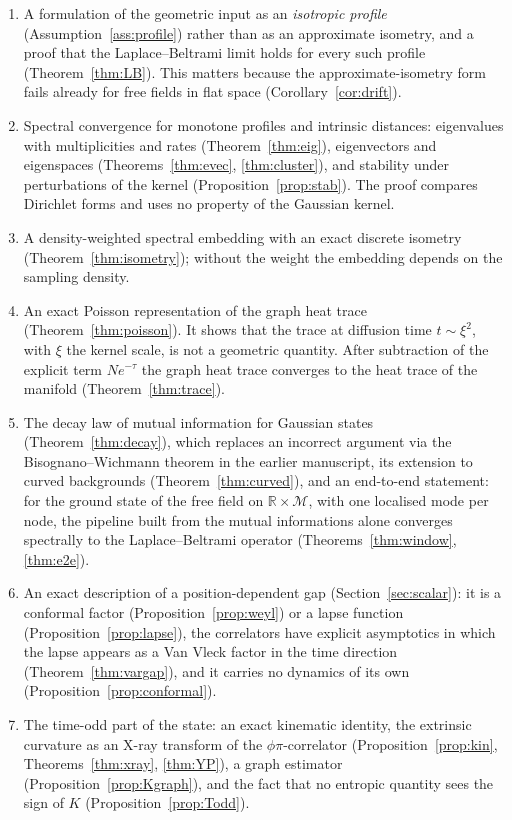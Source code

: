 \documentclass[11pt,a4paper]{article}
\theoremstyle{stmt}
\theoremstyle{defn}
\theoremstyle{rmk}
\numberwithin{equation}{section}
\newcommand{\M}{\mathcal{M}}
\newcommand{\R}{\mathbb{R}}
\begin{document}
\begin{enumerate}
\item A formulation of the geometric input as an \emph{isotropic profile} (Assumption~\ref{ass:profile}) rather than as an approximate isometry, and a proof that the Laplace--Beltrami limit holds for every such profile (Theorem~\ref{thm:LB}). This matters because the approximate-isometry form fails already for free fields in flat space (Corollary~\ref{cor:drift}).
\item Spectral convergence for monotone profiles and intrinsic distances: eigenvalues with multiplicities and rates (Theorem~\ref{thm:eig}), eigenvectors and eigenspaces (Theorems~\ref{thm:evec}, \ref{thm:cluster}), and stability under perturbations of the kernel (Proposition~\ref{prop:stab}). The proof compares Dirichlet forms and uses no property of the Gaussian kernel.
\item A density-weighted spectral embedding with an exact discrete isometry (Theorem~\ref{thm:isometry}); without the weight the embedding depends on the sampling density.
\item An exact Poisson representation of the graph heat trace (Theorem~\ref{thm:poisson}). It shows that the trace at diffusion time $t\sim\xi^2$, with $\xi$ the kernel scale, is not a geometric quantity. After subtraction of the explicit term $Ne^{-\tau}$ the graph heat trace converges to the heat trace of the manifold (Theorem~\ref{thm:trace}).
\item The decay law of mutual information for Gaussian states (Theorem~\ref{thm:decay}), which replaces an incorrect argument via the Bisognano--Wichmann theorem in the earlier manuscript, its extension to curved backgrounds (Theorem~\ref{thm:curved}), and an end-to-end statement: for the ground state of the free field on $\R\times\M$, with one localised mode per node, the pipeline built from the mutual informations alone converges spectrally to the Laplace--Beltrami operator (Theorems~\ref{thm:window}, \ref{thm:e2e}).
\item An exact description of a position-dependent gap (Section~\ref{sec:scalar}): it is a conformal factor (Proposition~\ref{prop:weyl}) or a lapse function (Proposition~\ref{prop:lapse}), the correlators have explicit asymptotics in which the lapse appears as a Van Vleck factor in the time direction (Theorem~\ref{thm:vargap}), and it carries no dynamics of its own (Proposition~\ref{prop:conformal}).
\item The time-odd part of the state: an exact kinematic identity, the extrinsic curvature as an X-ray transform of the $\phi\pi$-correlator (Proposition~\ref{prop:kin}, Theorems~\ref{thm:xray}, \ref{thm:YP}), a graph estimator (Proposition~\ref{prop:Kgraph}), and the fact that no entropic quantity sees the sign of $K$ (Proposition~\ref{prop:Todd}).

\end{enumerate}
\end{document}
